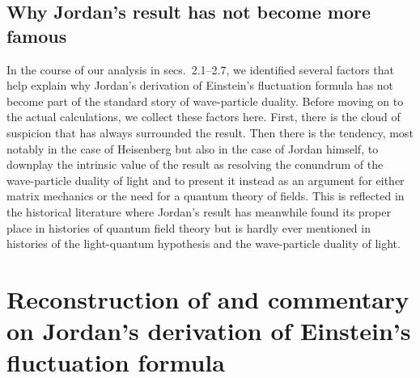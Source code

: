 \documentclass{elsart}
\begin{document}
\subsection{Why Jordan's result has not become more famous}

In the course of our analysis in secs.\ 2.1--2.7, we identified several factors that help explain why Jordan's derivation of Einstein's fluctuation formula has not become part of the standard story of wave-particle duality. Before moving on to the actual calculations, we collect these factors here. First, there is the cloud of suspicion that has always surrounded the result. Then there is the tendency, most notably in the case of Heisenberg but also in the case of Jordan himself, to downplay the intrinsic value of the result as resolving the conundrum of the wave-particle duality of light and to present it instead as an argument for either matrix mechanics or the need for a quantum theory of fields. This is reflected in the historical literature where Jordan's result has meanwhile found its proper place in histories of quantum field theory but is hardly ever mentioned in histories of the light-quantum hypothesis and the wave-particle duality of light.

\section{Reconstruction of and commentary on Jordan's derivation of Einstein's fluctuation formula}
\end{document}

